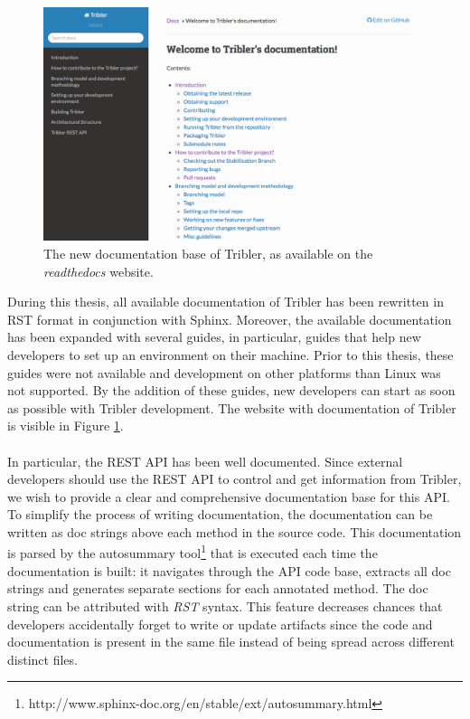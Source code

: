 \begin{figure}[h!]
	\centering
	\includegraphics[width=1.0\columnwidth]{images/improving_qa/readthedocs}
	\caption{The new documentation base of Tribler, as available on the \emph{readthedocs} website.}
	\label{fig:documentation-tribler}
\end{figure}

During this thesis, all available documentation of Tribler has been rewritten in RST format in conjunction with Sphinx. Moreover, the available documentation has been expanded with several guides, in particular, guides that help new developers to set up an environment on their machine. Prior to this thesis, these guides were not available and development on other platforms than Linux was not supported. By the addition of these guides, new developers can start as soon as possible with Tribler development. The website with documentation of Tribler is visible in Figure \ref{fig:documentation-tribler}.\\\\
In particular, the REST API has been well documented. Since external developers should use the REST API to control and get information from Tribler, we wish to provide a clear and comprehensive documentation base for this API. To simplify the process of writing documentation, the documentation can be written as doc strings above each method in the source code. This documentation is parsed by the autosummary tool\footnote{http://www.sphinx-doc.org/en/stable/ext/autosummary.html} that is executed each time the documentation is built: it navigates through the API code base, extracts all doc strings and generates separate sections for each annotated method. The doc string can be attributed with \emph{RST} syntax. This feature decreases chances that developers accidentally forget to write or update artifacts since the code and documentation is present in the same file instead of being spread across different distinct files.

